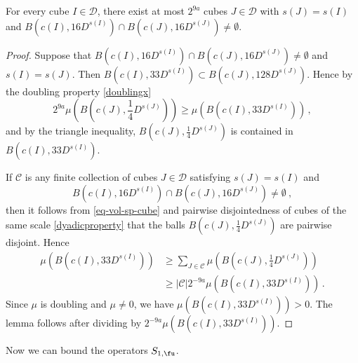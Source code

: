 \begin{lemma}
    \label{boundary-overlap}
    \leanok
    For every cube $I \in \mathcal{D}$, there exist at most $2^{9a}$ cubes $J \in \mathcal{D}$ with $s(J) = s(I)$ and $B(c(I), 16D^{s(I)}) \cap B(c(J), 16 D^{s(J)}) \ne \emptyset$.
\end{lemma}

\begin{proof}
    \leanok
    Suppose that $B(c(I), 16 D^{s(I)}) \cap B(c(J), 16 D^{s(J)}) \ne \emptyset$ and $s(I) = s(J)$. Then $B(c(I), 33 D^{s(I)}) \subset B(c(J), 128 D^{s(J)})$. Hence by the doubling property \eqref{doublingx}
    $$
        2^{9a}\mu(B(c(J), \frac{1}{4}D^{s(J)})) \ge \mu(B(c(I), 33 D^{s(I)}))\,,
    $$
    and by the triangle inequality, $B(c(J), \frac{1}{4}D^{s(J)})$ is contained in $B(c(I), 33 D^{s(I)})$.

    If $\mathcal{C}$ is any finite collection of cubes $J \in \mathcal{D}$ satisfying $s(J) = s(I)$ and
    \begin{equation*}
        B(c(I), 16 D^{s(I)}) \cap B(c(J), 16 D^{s(J)}) \ne\emptyset\ ,
    \end{equation*} then it follows from \eqref{eq-vol-sp-cube} and pairwise disjointedness of cubes of the same scale \eqref{dyadicproperty} that the balls $B(c(J), \frac{1}{4} D^{s(J)})$ are pairwise disjoint. Hence
    \begin{align*}
        \mu(B(c(I), 33 D^{s(I)})) &\ge \sum_{J \in \mathcal{C}} \mu(B(c(J), \frac{1}{4}D^{s(J)}))\\
        &\ge |\mathcal{C}| 2^{-9a} \mu(B(c(I), 33 D^{s(I)}))\,.
    \end{align*}
    Since $\mu$ is doubling and $\mu \ne 0$, we have $\mu(B(c(I), 33D^{s(I)})) > 0$. The lemma follows after dividing by $2^{-9a}\mu(B(c(I), 33D^{s(I)}))$.
\end{proof}

Now we can bound the operators $S_{1, \fu}$.

